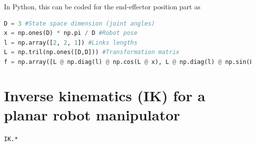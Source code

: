 \documentclass[10pt,a4paper]{article} %
\newcommand{\filename}[1]{\colorbox{rr2}{\color{white}\texttt{#1}}}
\begin{document}
%	
%	

In Python, this can be coded for the end-effector position part as
\begin{lstlisting}[language=Python,linewidth=\textwidth]
D = 3 #State space dimension (joint angles) 
x = np.ones(D) * np.pi / D #Robot pose
l = np.array([2, 2, 1]) #Links lengths
L = np.tril(np.ones([D,D])) #Transformation matrix
f = np.array([L @ np.diag(l) @ np.cos(L @ x), L @ np.diag(l) @ np.sin(L @ x)]) #Forward kinematics
\end{lstlisting}


\newpage

\section{Inverse kinematics (IK) for a planar robot manipulator}\label{sec:IK}
\begin{flushright}
\filename{IK.*}
\end{flushright}
\end{document}
